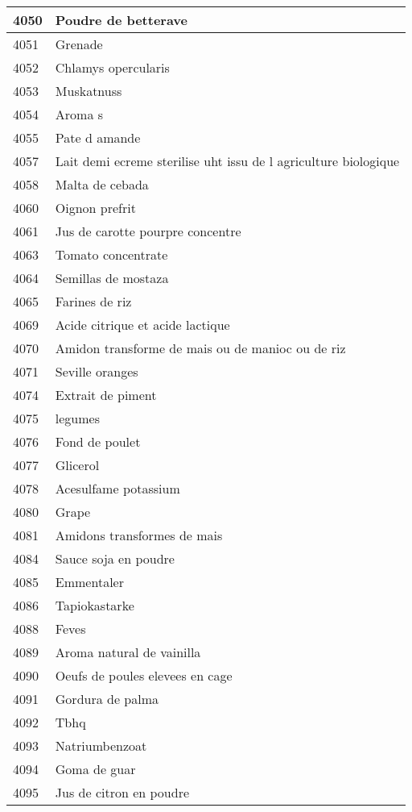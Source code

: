 \begin{longtable}{|l|l|}
4050 & Poudre de betterave \\ \hline 
4051 & Grenade \\ \hline 
4052 & Chlamys opercularis \\ \hline 
4053 & Muskatnuss \\ \hline 
4054 & Aroma s \\ \hline 
4055 & Pate d amande \\ \hline 
4057 & Lait demi ecreme sterilise uht issu de l agriculture biologique \\ \hline 
4058 & Malta de cebada \\ \hline 
4060 & Oignon prefrit \\ \hline 
4061 & Jus de carotte pourpre concentre \\ \hline 
4063 & Tomato concentrate \\ \hline 
4064 & Semillas de mostaza \\ \hline 
4065 & Farines de riz \\ \hline 
4069 & Acide citrique et acide lactique \\ \hline 
4070 & Amidon transforme de mais ou de manioc ou de riz \\ \hline 
4071 & Seville oranges \\ \hline 
4074 & Extrait de piment \\ \hline 
4075 & legumes \\ \hline 
4076 & Fond de poulet \\ \hline 
4077 & Glicerol \\ \hline 
4078 & Acesulfame potassium \\ \hline 
4080 & Grape \\ \hline 
4081 & Amidons transformes de mais \\ \hline 
4084 & Sauce soja en poudre \\ \hline 
4085 & Emmentaler \\ \hline 
4086 & Tapiokastarke \\ \hline 
4088 & Feves \\ \hline 
4089 & Aroma natural de vainilla \\ \hline 
4090 & Oeufs de poules elevees en cage \\ \hline 
4091 & Gordura de palma \\ \hline 
4092 & Tbhq \\ \hline 
4093 & Natriumbenzoat \\ \hline 
4094 & Goma de guar \\ \hline 
4095 & Jus de citron en poudre \\ \hline 

\end{longtable}
